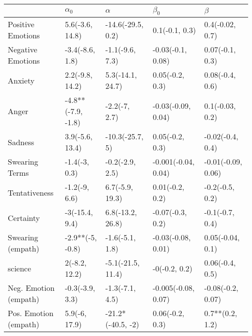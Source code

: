 \begin{tabular}{lllll}
\toprule
{} &          $\alpha_0$ &           $\alpha$ &            $\beta_0$ &             $\beta$ \\
\midrule
Positive Emotions     &     5.6(-3.6, 14.8) &  -14.6(-29.5, 0.2) &       0.1(-0.1, 0.3) &     0.4(-0.02, 0.7) \\
Negative Emotions     &     -3.4(-8.6, 1.8) &    -1.1(-9.6, 7.3) &    -0.03(-0.1, 0.08) &     0.07(-0.1, 0.3) \\
Anxiety               &     2.2(-9.8, 14.2) &   5.3(-14.1, 24.7) &      0.05(-0.2, 0.3) &     0.08(-0.4, 0.6) \\
Anger                 &  -4.8**(-7.9, -1.8) &      -2.2(-7, 2.7) &   -0.03(-0.09, 0.04) &     0.1(-0.03, 0.2) \\
Sadness               &     3.9(-5.6, 13.4) &    -10.3(-25.7, 5) &      0.05(-0.2, 0.3) &    -0.02(-0.4, 0.4) \\
Swearing Terms        &       -1.4(-3, 0.3) &    -0.2(-2.9, 2.5) &  -0.001(-0.04, 0.04) &  -0.01(-0.09, 0.06) \\
Tentativeness         &       -1.2(-9, 6.6) &    6.7(-5.9, 19.3) &      0.01(-0.2, 0.2) &     -0.2(-0.5, 0.2) \\
Certainty             &      -3(-15.4, 9.4) &   6.8(-13.2, 26.8) &     -0.07(-0.3, 0.2) &     -0.1(-0.7, 0.4) \\
Swearing (empath)     &    -2.9**(-5, -0.8) &    -1.6(-5.1, 1.8) &   -0.03(-0.08, 0.01) &    0.05(-0.04, 0.1) \\
science               &       2(-8.2, 12.2) &  -5.1(-21.5, 11.4) &        -0(-0.2, 0.2) &     0.06(-0.4, 0.5) \\
Neg. Emotion (empath) &     -0.3(-3.9, 3.3) &    -1.3(-7.1, 4.5) &  -0.005(-0.08, 0.07) &   -0.08(-0.2, 0.07) \\
Pos. Emotion (empath) &       5.9(-6, 17.9) &  -21.2*(-40.5, -2) &      0.06(-0.2, 0.3) &     0.7**(0.2, 1.2) \\
\bottomrule
\end{tabular}
